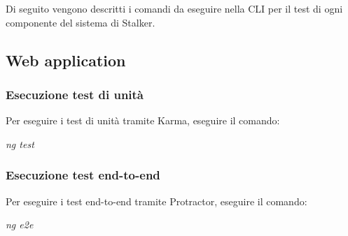 \documentclass[../manuale-sviluppatore.tex]{subfiles}
\begin{document}
Di seguito vengono descritti i comandi da eseguire nella CLI per il test di ogni componente del sistema di Stalker.


\subsection{Web application}%
\label{sub:}

\subsubsection{Esecuzione test di unità}%
\label{subs:esecuzione_test_di_unita}

Per eseguire i test di unità tramite Karma, eseguire il comando: \par\bigskip

\begin{center}
  \textit{ng test}
\end{center}
\par\bigskip

\subsubsection{Esecuzione test end-to-end}%
\label{subs:esecuzione_test_end_to_end}

Per eseguire i test end-to-end tramite Protractor, eseguire il comando: \par\bigskip

\begin{center}
  \textit{ng e2e}
\end{center}
\par\bigskip

\end{document}
